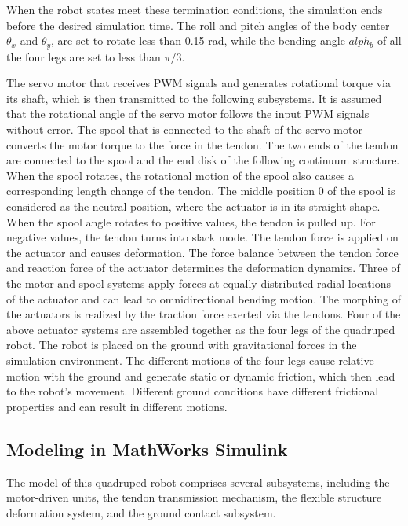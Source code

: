 When the robot states meet these termination conditions, the simulation ends before the desired simulation time. The roll and pitch angles of the body center $\theta_x$ and $\theta_y$, are set to rotate less than 0.15 rad, while the bending angle $alph_b$ of all the four legs are set to less than $\pi/3$.

The servo motor that receives \ac{PWM} signals and generates rotational torque via its shaft, which is then transmitted to the following subsystems. It is assumed that the rotational angle of the servo motor follows the input \ac{PWM} signals without error. The spool that is connected to the shaft of the servo motor converts the motor torque to the force in the tendon. The two ends of the tendon are connected to the spool and the end disk of the following continuum structure. When the spool rotates, the rotational motion of the spool also causes a corresponding length change of the tendon. The middle position 0 of the spool is considered as the neutral position, where the actuator is in its straight shape. When the spool angle rotates to positive values, the tendon is pulled up. For negative values, the tendon turns into slack mode. The tendon force is applied on the actuator and causes deformation. The force balance between the tendon force and reaction force of the actuator determines the deformation dynamics. Three of the motor and spool systems apply forces at equally distributed radial locations of the actuator and can lead to omnidirectional bending motion. The morphing of the actuators is realized by the traction force exerted via the tendons. Four of the above actuator systems are assembled together as the four legs of the quadruped robot. The robot is placed on the ground with gravitational forces in the simulation environment. The different motions of the four legs cause relative motion with the ground and generate static or dynamic friction, which then lead to the robot’s movement. Different ground conditions have different frictional properties and can result in different motions.


\subsection{Modeling in MathWorks Simulink\texorpdfstring{\textsuperscript{\textregistered}}{(R)}}
The model of this quadruped robot comprises several subsystems, including the motor-driven units, the tendon transmission mechanism, the flexible structure deformation system, and the ground contact subsystem. 


